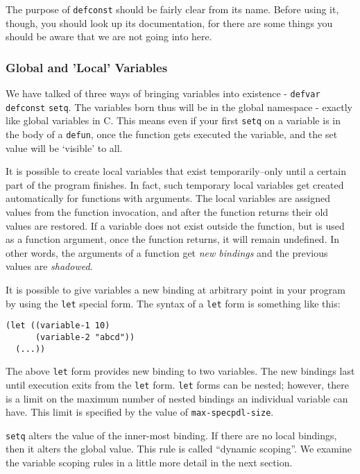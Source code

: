 \documentclass[10pt]{article}
\begin{document}
The purpose of \texttt{defconst} should be fairly clear from its name.  Before
using it, though, you should look up its documentation, for there are some
things you should be aware that we are not going into here.

\subsubsection{Global and 'Local' Variables}

We have talked of three ways of bringing variables into existence -
\texttt{defvar} \texttt{defconst} \texttt{setq}.  The variables born thus will
be in the global namespace - exactly like global variables in C.  This means
even if your first \texttt{setq} on a variable is in the body of a
\texttt{defun}, once the function gets executed the variable, and the set value
will be `visible' to all.

It is possible to create local variables that exist temporarily--only until a
certain part of the program finishes.  In fact, such temporary local variables
get created automatically for functions with arguments.  The local variables
are assigned values from the function invocation, and after the function
returns their old values are restored.  If a variable does not exist outside
the function, but is used as a function argument, once the function returns, it
will remain undefined.  In other words, the arguments of a function get
\textit{new bindings} and the previous values are \textit{shadowed}.

It is possible to give variables a new binding at arbitrary point in your
program by using the \texttt{let} special form.  The syntax of a \texttt{let}
form is something like this:

\begin{verbatim}
(let ((variable-1 10)
      (variable-2 "abcd"))
  (...))
\end{verbatim}

The above \texttt{let} form provides new binding to two variables.  The new
bindings last until execution exits from the \texttt{let} form.  \texttt{let}
forms can be nested; however, there is a limit on the maximum number of nested
bindings an individual variable can have.  This limit is specified by the value
of \texttt{max-specpdl-size}.

\texttt{setq} alters the value of the inner-most binding.  If there are no
local bindings, then it alters the global value.  This rule is called ``dynamic
scoping''.  We examine the variable scoping rules in a little more detail in
the next section.
\end{document}
